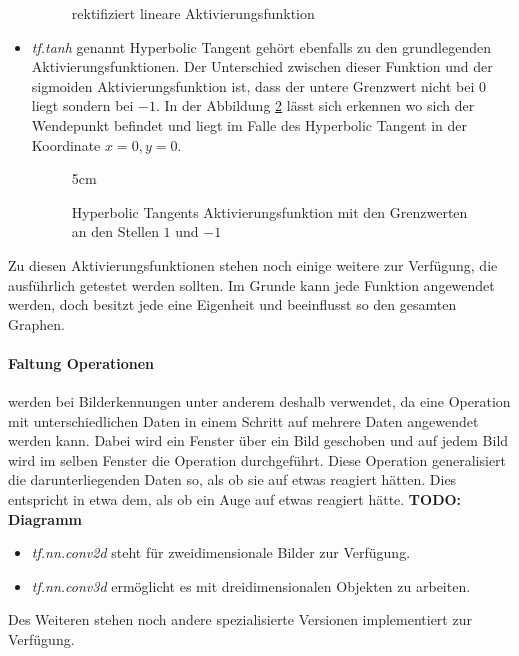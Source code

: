 \begin{itemize}
\begin{figure}[ht!]
{
	}
	\caption{rektifiziert lineare Aktivierungsfunktion}
	\label{fig:rektifiziert lineare Aktivierungsfunktion}
\end{figure}
	\item \textit{tf.tanh} genannt Hyperbolic Tangent gehört ebenfalls zu den grundlegenden Aktivierungsfunktionen. 
	Der Unterschied zwischen dieser Funktion und der sigmoiden Aktivierungsfunktion ist, dass der untere Grenzwert nicht bei $0$ liegt sondern bei $-1$. 
	In der Abbildung \ref{fig:Hyperbolic Tangents Aktivierungsfunktion} lässt sich erkennen wo sich der Wendepunkt befindet und liegt im Falle des Hyperbolic Tangent in der Koordinate $x = 0, y = 0$. 
\begin{figure}[ht!]
	\centering
	\resizebox {!} {5cm} { %
	}
	\caption{Hyperbolic Tangents Aktivierungsfunktion mit den Grenzwerten an den Stellen $1$ und $-1$}
	\label{fig:Hyperbolic Tangents Aktivierungsfunktion}
\end{figure}
\end{itemize}
Zu diesen Aktivierungsfunktionen stehen noch einige weitere zur Verfügung, die ausführlich getestet werden sollten. 
Im Grunde kann jede Funktion angewendet werden, doch besitzt jede eine Eigenheit und beeinflusst so den gesamten Graphen. 

\paragraph{Faltung Operationen} werden bei Bilderkennungen unter anderem deshalb verwendet, da eine Operation mit unterschiedlichen Daten in einem Schritt auf mehrere Daten angewendet werden kann. 
Dabei wird ein Fenster über ein Bild geschoben und auf jedem Bild wird im selben Fenster die Operation durchgeführt. 
Diese Operation generalisiert die darunterliegenden Daten so, als ob sie auf etwas reagiert hätten. 
Dies entspricht in etwa dem, als ob ein Auge auf etwas reagiert hätte. 
\textbf{TODO: Diagramm}
\begin{itemize}
	\item \textit{tf.nn.conv2d} steht für zweidimensionale Bilder zur Verfügung. 
	\item \textit{tf.nn.conv3d} ermöglicht es mit dreidimensionalen Objekten zu arbeiten.
\end{itemize}
Des Weiteren stehen noch andere spezialisierte Versionen implementiert zur Verfügung.

